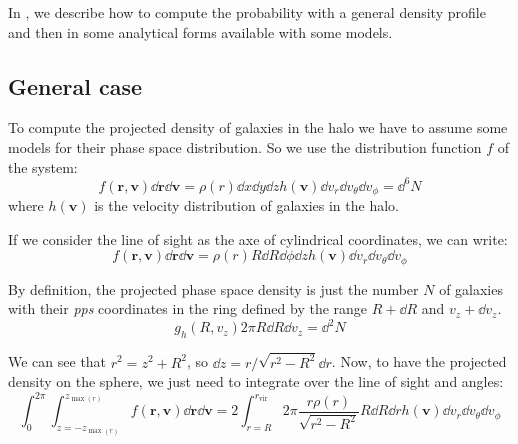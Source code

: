 In , we describe how to compute the
probability with a general density profile and then in
 some analytical forms
available with some models.

\subsection{General case}
\label{sub:general_case}

To compute the projected density of galaxies in the halo we have to assume some
models for their phase space distribution. So we use the distribution function
$f$ of the system:
%
\begin{equation}
    f\left(\textbf{r},\textbf{v}\right)\dd\textbf{r}\dd\textbf{v}
    =\rho\left(r\right)\dd{x}\dd{y}\dd{z}
    h\left(\textbf{v}\right)
    \dd v_r\dd v_\theta\dd v_\phi=
    \dd^6 N
\end{equation}
%
where $h\left(\textbf{v}\right)$ is the velocity distribution of galaxies in
the halo.

If we consider the line of sight as the axe of cylindrical coordinates, we
can write:
%
\begin{equation}
    f\left(\textbf{r},\textbf{v}\right)\dd\textbf{r}\dd\textbf{v}=
    \rho\left(r\right)R\dd{R}\dd\phi\dd{z}h\left(\textbf{v}\right)
    \dd{v_r}\dd{v_\theta}\dd{v_\phi}
\end{equation}

By definition, the projected phase space density is just the number $N$ of
galaxies with their \emph{pps} coordinates in the ring defined by the range
$R+\dd R$ and $v_z+\dd v_z$.
%
\begin{equation}
    g_h \left(R, v_z\right)2\pi R \dd R \dd v_z = \dd^2 N
\end{equation}

We can see that $r^2=z^2+R^2$, so $\dd{z}=r/\sqrt{r^2-R^2}\dd{r}$.
Now, to have the projected density on the sphere, we just need to integrate
over the line of sight and angles:
%
\begin{equation}
    \label{eq:intfunc}
    \int_0^{2\pi}\int_{z=-z_{\max\left(r\right)}}^{z_{\max\left(r\right)}}
    f\left(\textbf{r},\textbf{v}\right)\dd\textbf{r}
    \dd{\textbf{v}}=2\int_{r=R}^{r_{\mathrm{vir}}}2\pi
    \frac{r\rho\left({r}\right)}{\sqrt{r^2-R^2}}{R}\dd{R}\dd{r}
    {h\left({\textbf{v}}\right)}\dd{v_r}\dd{v_\theta}\dd{v_\phi}
\end{equation}

